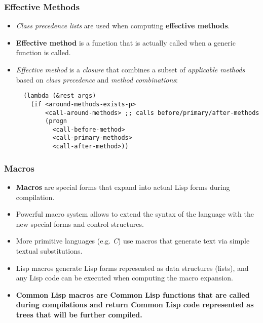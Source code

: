 \documentclass{beamer}
\begin{document}
\begin{frame}[fragile]
  \frametitle{Effective Methods}
  \begin{itemize}
  \item \textit{Class precedence lists} are used when computing
    \textbf{effective methods}.
  \item \textbf{Effective method} is a function that is actually called when a
    generic function is called.    
  \item \textit{Effective method} is a \textit{closure} that combines a subset
    of \textit{applicable methods} based on \textit{class precedence} and
    \textit{method combinations}:
\begin{verbatim}
  (lambda (&rest args)
    (if <around-methods-exists-p>
        <call-around-methods> ;; calls before/primary/after-methods
        (progn
          <call-before-method>
          <call-primary-methods>
          <call-after-method>))
\end{verbatim}    
  \end{itemize}
\end{frame}

\begin{frame}[fragile]
  \frametitle{Macros}
  \begin{itemize}
  \item \textbf{Macros} are special forms that expand into actual Lisp forms
    during compilation.
  \item Powerful macro system allows to extend the syntax of the language with
    the new special forms and control structures.
  \item More primitive languages (e.g. \textit{C}) use macros that generate
    text via simple textual substitutions.
  \item Lisp macros generate Lisp forms represented as data structures (lists),
    and any Lisp code can be executed when computing the macro expansion.
  \item \textbf{Common Lisp macros are Common Lisp functions that are called
      during compilations and return Common Lisp code represented as trees that
      will be further compiled.}
  \end{itemize}
\end{frame}
\end{document}

